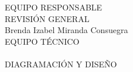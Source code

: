 {\Bold \LARGE EQUIPO RESPONSABLE}\\[2cm]
{\Bold \large \color{color1!89!black} REVISIÓN GENERAL}\\[0.2cm]
Brenda Izabel Miranda Consuegra\\[0.8cm]
{\Bold \large \color{color1!89!black} EQUIPO TÉCNICO}\\[0.2cm]
\\[0.8cm]
{\Bold \large \color{color1!89!black} DIAGRAMACIÓN Y DISEÑO}\\[0.2cm]
